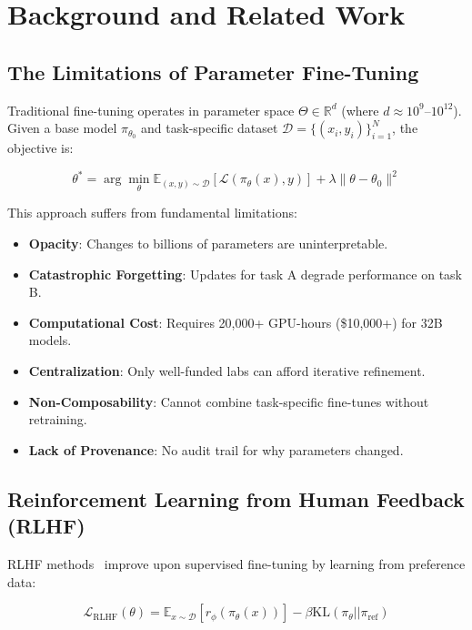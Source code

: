 \section{Background and Related Work}


\subsection{The Limitations of Parameter Fine-Tuning}

Traditional \LLM{} fine-tuning operates in parameter space $\Theta \in \mathbb{R}^d$ (where $d \approx 10^{9}$--$10^{12}$). Given a base model $\pi_{\theta_0}$ and task-specific dataset $\mathcal{D} = \{(x_i, y_i)\}_{i=1}^N$, the objective is:

\begin{equation}
\theta^* = \arg\min_{\theta} \mathbb{E}_{(x,y) \sim \mathcal{D}}[\mathcal{L}(\pi_\theta(x), y)] + \lambda \|\theta - \theta_0\|^2
\end{equation}

This approach suffers from fundamental limitations:

\begin{itemize}
    \item \textbf{Opacity}: Changes to billions of parameters are uninterpretable.
    \item \textbf{Catastrophic Forgetting}: Updates for task A degrade performance on task B.
    \item \textbf{Computational Cost}: Requires 20,000+ GPU-hours (\$10,000+) for 32B models.
    \item \textbf{Centralization}: Only well-funded labs can afford iterative refinement.
    \item \textbf{Non-Composability}: Cannot combine task-specific fine-tunes without retraining.
    \item \textbf{Lack of Provenance}: No audit trail for why parameters changed.
\end{itemize}

\subsection{Reinforcement Learning from Human Feedback (RLHF)}

RLHF methods~\cite{christiano2017deep,ouyang2022training} improve upon supervised fine-tuning by learning from preference data:

\begin{equation}
\mathcal{L}_{\text{RLHF}}(\theta) = \mathbb{E}_{x \sim \mathcal{D}}[r_\phi(\pi_\theta(x))] - \beta \text{KL}(\pi_\theta || \pi_{\text{ref}})
\end{equation}

